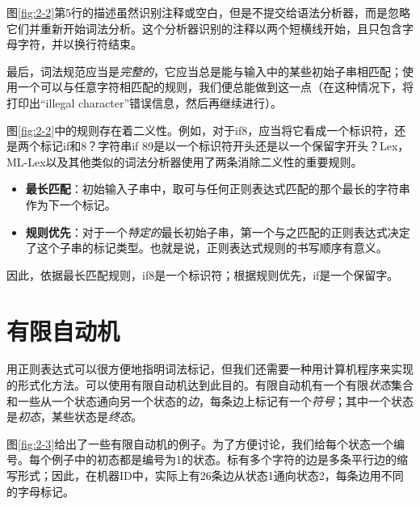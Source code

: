\documentclass[cn,11pt,chinese]{elegantbook}
\begin{document}
图\ref{fig:2-2}第5行的描述虽然识别注释或空白，但是不提交给语法分析器，而是忽略它们并重新开始词法分析。这个分析器识别的注释以两个短横线开始，且只包含字母字符，并以换行符结束。

最后，词法规范应当是\textit{完整的}，它应当总是能与输入中的某些初始子串相匹配；使用一个可以与任意字符相匹配的规则，我们便总能做到这一点（在这种情况下，将打印出“illegal character”错误信息，然后再继续进行）。

图\ref{fig:2-2}中的规则存在着二义性。例如，对于if8，应当将它看成一个标识符，还是两个标记if和8？字符串if 89是以一个标识符开头还是以一个保留字开头？Lex，ML-Lex以及其他类似的词法分析器使用了两条消除二义性的重要规则。

\begin{itemize}
  \item \textbf{最长匹配}：初始输入子串中，取可与任何正则表达式匹配的那个最长的字符串作为下一个标记。
  \item \textbf{规则优先}：对于一个\textit{特定的}最长初始子串，第一个与之匹配的正则表达式决定了这个子串的标记类型。也就是说，正则表达式规则的书写顺序有意义。
\end{itemize}

因此，依据最长匹配规则，if8是一个标识符；根据规则优先，if是一个保留字。

\section{有限自动机}

用正则表达式可以很方便地指明词法标记，但我们还需要一种用计算机程序来实现的形式化方法。可以使用有限自动机达到此目的。有限自动机有一个有限\textit{状态}集合和一些从一个状态通向另一个状态的\textit{边}，每条边上标记有一个\textit{符号}；其中一个状态是\textit{初态}，某些状态是\textit{终态}。

图\ref{fig:2-3}给出了一些有限自动机的例子。为了方便讨论，我们给每个状态一个编号。每个例子中的初态都是编号为1的状态。标有多个字符的边是多条平行边的缩写形式；因此，在机器ID中，实际上有26条边从状态1通向状态2，每条边用不同的字母标记。
\end{document}
